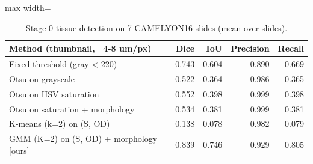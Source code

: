 \begin{table}[H]\centering\small
\caption{Stage-0 tissue detection on 7 CAMELYON16 slides (mean over slides).}\label{tab:tissue}
\begin{adjustbox}{max width=\linewidth}\begin{tabular}{lrrrr}\toprule
\textbf{Method (thumbnail, ~4-8 um/px)} & \textbf{Dice} & \textbf{IoU} & \textbf{Precision} & \textbf{Recall} \\\midrule
Fixed threshold (gray < 220) & 0.743 & 0.604 & 0.890 & 0.669 \\
Otsu on grayscale & 0.522 & 0.364 & 0.986 & 0.365 \\
Otsu on HSV saturation & 0.552 & 0.398 & 0.999 & 0.398 \\
Otsu on saturation + morphology & 0.534 & 0.381 & 0.999 & 0.381 \\
K-means (k=2) on (S, OD) & 0.138 & 0.078 & 0.982 & 0.079 \\
GMM (K=2) on (S, OD) + morphology {[}ours{]} & 0.839 & 0.746 & 0.929 & 0.805 \\
\bottomrule\end{tabular}\end{adjustbox}\end{table}